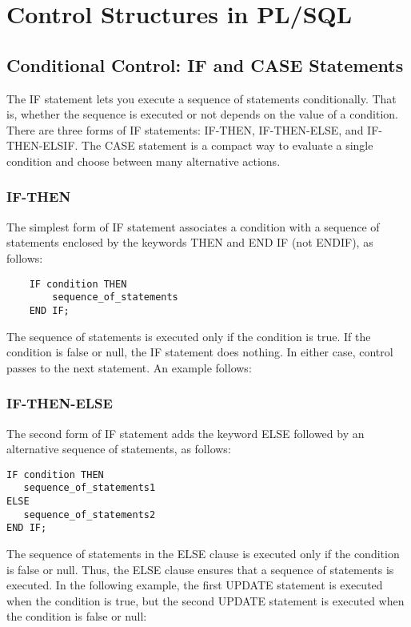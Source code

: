 \section{Control Structures in PL/SQL}

\subsection{Conditional Control: IF and CASE Statements}
The IF statement lets you execute a sequence of statements conditionally. That is, whether the sequence is executed or not depends on the value of a condition. There are three forms of IF statements: IF-THEN, IF-THEN-ELSE, and IF-THEN-ELSIF. The CASE statement is a compact way to evaluate a single condition and choose between many alternative actions.

\subsubsection{IF-THEN}
The simplest form of IF statement associates a condition with a sequence of statements enclosed by the keywords THEN and END IF (not ENDIF), as follows:
\begin{verbatim}
	IF condition THEN
   		sequence_of_statements
	END IF;
\end{verbatim}
The sequence of statements is executed only if the condition is true. If the condition is false or null, the IF statement does nothing. In either case, control passes to the next statement. An example follows:


\subsubsection{IF-THEN-ELSE}
The second form of IF statement adds the keyword ELSE followed by an alternative sequence of statements, as follows:
\begin{verbatim}
IF condition THEN
   sequence_of_statements1
ELSE
   sequence_of_statements2
END IF;
\end{verbatim}
The sequence of statements in the ELSE clause is executed only if the condition is false or null. Thus, the ELSE clause ensures that a sequence of statements is executed. In the following example, the first UPDATE statement is executed when the condition is true, but the second UPDATE statement is executed when the condition is false or null:


